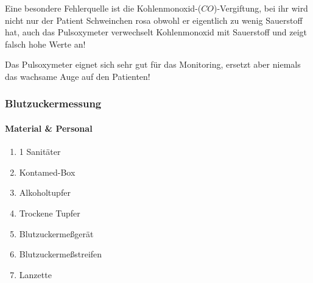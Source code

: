 Eine besondere Fehlerquelle ist die Kohlenmonoxid-($CO$)-Vergiftung, bei ihr wird nicht nur der Patient
Schweinchen rosa obwohl er eigentlich zu wenig Sauerstoff
hat, auch das Pulsoxymeter verwechselt Kohlenmonoxid mit
Sauerstoff und zeigt falsch hohe Werte an!

Das Pulsoxymeter eignet sich sehr gut für das Monitoring,
ersetzt aber niemals das wachsame Auge auf den Patienten!

\subsubsection{Blutzuckermessung}
\paragraph{Material \& Personal}

\begin{enumerate}
  \item 1 Sanitäter
  \item Kontamed-Box
  \item Alkoholtupfer
  \item Trockene Tupfer
  \item Blutzuckermeßgerät
  \item Blutzuckermeßstreifen
  \item Lanzette
\end{enumerate}



